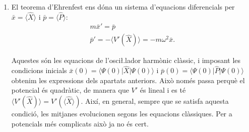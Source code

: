 \documentclass[12pt]{article}
\numberwithin{table}{section}
\numberwithin{figure}{section}
\numberwithin{equation}{section}
\newcommand{\ket}[1]{\vert #1 \rangle}
\newcommand{\bra}[1]{\langle #1 \vert}
\begin{document}
\begin{enumerate}[label=(\alph*), font=\bfseries \sffamily, wide, labelwidth=!, labelindent=0pt]
\item El teorema d'Ehrenfest ens dóna un sistema d'equacions diferencials per \( \bar{x} = \langle \hat{X} \rangle \) i \( \bar{p} = \langle \hat{P} \rangle \):
	\begin{gather*}
		m \bar{x}' = \bar{p} \\
		\bar{p}' = - \langle V'(\hat{X}) \rangle = - m\omega^2 \bar{x}. 
	\end{gather*}

	Aquestes són les equacions de l'osci\l.lador harmònic clàssic, i imposant les condicions inicials \( \bar{x}(0) = \bra{\Psi(0)}\hat{X} \ket{\Psi(0)} \) i \( \bar{p}(0) = \bra{\Psi(0)}\hat{P}\ket{\Psi(0)} \) obtenim les expressions dels apartats anteriors. Això només passa perquè el potencial és quadràtic, de manera que \( V' \) és lineal i es té \( \langle V'(\hat{X}) \rangle = V'(\langle \hat{X} \rangle) \). Així, en general, sempre que se satisfa aquesta condició, les mitjanes evolucionen segons les equacions clàssiques. Per a potencials més complicats això ja no és cert.  

\end{enumerate}
\end{document}
